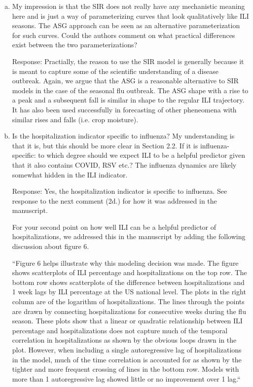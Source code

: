 \documentclass{article}
\newcommand{\spencer}[1]{{\color{red} Response: #1}}
\begin{document}
\begin{enumerate}[1.]
\begin{enumerate}[a.]
{We cite Osthus et al. 2019, who also touch on this.}


\item My impression is that the SIR does not really have any mechanistic meaning here and is just a
way of parameterizing curves that look qualitatively like ILI seasons. The ASG approach can be
seen as an alternative parameterization for such curves. Could the authors comment on what
practical differences exist between the two parameterizations?

\spencer{Practially, the reason to use the SIR model is generally because it is meant
to capture some of the scientific understanding of a disease outbreak. Again, we argue 
that the ASG is a reasonable alternative to SIR models in the case of the seasonal flu
outbreak. The ASG shape with a rise to a peak and a subsequent fall is similar in shape
to the regular ILI trajectory. It has also been used successfully in forecasting of 
other pheneomena with similar rises and falls (i.e. crop moisture)}.



\item Is the hospitalization indicator specific to influenza? My understanding is that it is, but this
should be more clear in Section 2.2. If it is influenza-specific: to which degree should we expect ILI
to be a helpful predictor given that it also contains COVID, RSV etc.? The influenza dynamics are
likely somewhat hidden in the ILI indicator.

\spencer{Yes, the hospitalization indicator is specific to influenza. See 
response to the next comment (2d.) for how it was addressed in the manuscript. 

For your second point on how well ILI can be a helpful predictor of hospitalizations,
we addressed this in the manuscript by adding the following discussion about
figure 6.


``Figure 6 helps
illustrate why this modeling decision was made.
The figure shows scatterplots of ILI percentage and 
hospitalizations on the top row.
The bottom row shows scatterplots of the difference between hospitalizations and 
1 week lags
by ILI percentage at the US national level. The plots in the right column
are of the logarithm of hospitalizations. The lines through the points are
drawn by connecting hospitalizations for consecutive weeks during the flu 
season.
These plots show that a linear or quadratic relationship between ILI percentage 
and hospitalizations does not capture much of the temporal correlation in 
hospitalizations as shown by the obvious loops drawn in the plot. 
However, when including a 
single autoregressive lag of hospitalizations in the model, much of the time 
correlation is
accounted for as shown by the tighter and more frequent crossing of lines
in the bottom row. Models with more than 1 autoregressive
lag showed little or no 
improvement over 1 lag.``}





\end{enumerate}
\end{enumerate}
\end{document}
